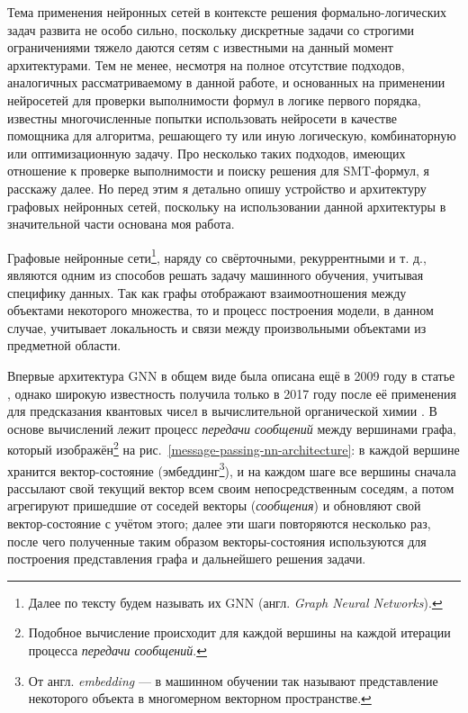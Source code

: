 
Тема применения нейронных сетей в контексте решения формально-логических задач развита не особо сильно, поскольку дискретные задачи со строгими ограничениями тяжело даются сетям с известными на данный момент архитектурами. Тем не менее, несмотря на полное отсутствие подходов, аналогичных рассматриваемому в данной работе, и основанных на применении нейросетей для проверки выполнимости формул в логике первого порядка, известны многочисленные попытки использовать нейросети в качестве помощника для алгоритма, решающего ту или иную логическую, комбинаторную или оптимизационную задачу. Про несколько таких подходов, имеющих отношение к проверке выполнимости и поиску решения для SMT-формул, я расскажу далее. Но перед этим я детально опишу устройство и архитектуру графовых нейронных сетей, поскольку на использовании данной архитектуры в значительной части основана моя работа.

 \label{gnn-architecture}

Графовые нейронные сети\footnote{Далее по тексту будем называть их GNN (англ. \textit{Graph Neural Networks}).}, наряду со свёрточными, рекуррентными и т. д., являются одним из способов решать задачу машинного обучения, учитывая специфику данных. Так как графы отображают взаимоотношения между объектами некоторого множества, то и процесс построения модели, в данном случае, учитывает локальность и связи между произвольными объектами из предметной области.

Впервые архитектура GNN в общем виде была описана ещё в 2009 году в статье \cite{gnn-intro-paper}, однако широкую известность получила только в 2017 году после её применения для предсказания квантовых чисел в вычислительной органической химии \cite{gnn-quantum-chemistry-paper}. В основе вычислений лежит процесс \textit{передачи сообщений} между вершинами графа, который изображён\footnote{Подобное вычисление происходит для каждой вершины на каждой итерации процесса \textit{передачи сообщений}.} на рис.~\ref{message-passing-nn-architecture}: в каждой вершине хранится вектор-состояние (эмбеддинг\footnote{От англ. \textit{embedding} --- в машинном обучении так называют представление некоторого объекта в многомерном векторном пространстве.}), и на каждом шаге все вершины сначала рассылают свой текущий вектор всем своим непосредственным соседям, а потом агрегируют пришедшие от соседей векторы (\textit{сообщения}) и обновляют свой вектор-состояние с учётом этого; далее эти шаги повторяются несколько раз, после чего полученные таким образом векторы-состояния используются для построения представления графа и дальнейшего решения задачи.

